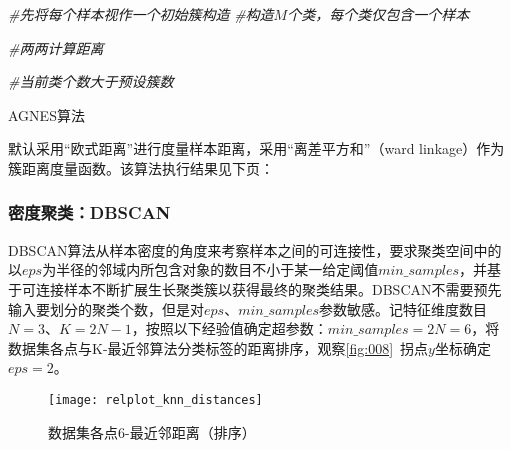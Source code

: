 \documentclass[withoutpreface,bwprint]{cumcmthesis}
\begin{document}
\IncMargin{1em}
\begin{algorithm}   

    \BlankLine

    \BlankLine
    \emph{\#先将每个样本视作一个初始簇构造}\;
    \emph{\#构造$M$个类，每个类仅包含一个样本}\;

    \BlankLine
    \emph{\#两两计算距离}\;

    \BlankLine
    \emph{\#当前类个数大于预设簇数}\;
    \caption{AGNES算法}
    \label{algo:001}
\end{algorithm}
\DecMargin{1em}

默认采用“欧式距离”进行度量样本距离，采用“离差平方和”（ward linkage）作为簇距离度量函数。该算法执行结果见下页：

\subsubsection{密度聚类：DBSCAN}

DBSCAN算法从样本密度的角度来考察样本之间的可连接性，要求聚类空间中的以$eps$为半径的邻域内所包含对象的数目不小于某一给定阈值$min\_samples$，并基于可连接样本不断扩展生长聚类簇以获得最终的聚类结果。DBSCAN不需要预先输入要划分的聚类个数，但是对$eps$、$min\_samples$参数敏感。记特征维度数目$N=3$、$K=2N-1$，按照以下经验值确定超参数\cite{eps1,eps2}：$min\_samples=2N=6$，将数据集各点与K-最近邻算法分类标签的距离排序，观察\cref{fig:008}~拐点$y$坐标确定$eps=2$。

\begin{figure}[!htbp]
    \centering
    \texttt{[image: relplot\_knn\_distances]}
    \caption{数据集各点6-最近邻距离（排序）}
    \label{fig:010}
\end{figure}
\end{document}
